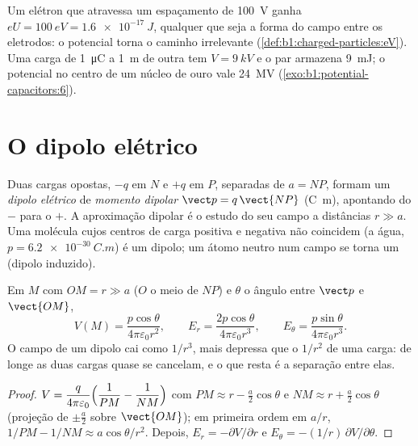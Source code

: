 \begin{example}\label{ex:b1:potential-capacitors:eV}
Um elétron que atravessa um espaçamento de \qty{100}{V} ganha $eU = \qty{100}{eV} =
\qty{1.6e-17}{J}$, qualquer que seja a forma do campo entre os
eletrodos: o potencial torna o caminho irrelevante
(\cref{def:b1:charged-particles:eV}). Uma carga de \qty{1}{\micro C} a
\qty{1}{m} de outra tem $V = \qty{9}{kV}$ e o par armazena
\qty{9}{mJ}; o potencial no centro de um núcleo de ouro vale
\qty{24}{MV} (\cref{exo:b1:potential-capacitors:6}).
\end{example}

\section{O dipolo elétrico}

\begin{definition}\label{def:b1:potential-capacitors:dipole}
Duas cargas opostas, $-q$ em $N$ e $+q$ em $P$, separadas de $a = NP$,
formam um \emph{dipolo elétrico} de \emph{momento dipolar}
$\vect p = q\,\vect{NP}$ (\unit{C.m}), apontando do $-$ para o $+$. A aproximação
dipolar é o estudo do seu campo a distâncias $r \gg a$. Uma
molécula cujos centros de carga positiva e negativa não coincidem
(a água, $p = \qty{6.2e-30}{C.m}$) é um dipolo; um átomo neutro num campo
se torna um (dipolo induzido).
\end{definition}

\begin{proposition}\label{prop:b1:potential-capacitors:dipolefield}
Em $M$ com $OM = r \gg a$ ($O$ o meio de $NP$) e $\theta$ o
ângulo entre $\vect p$ e $\vect{OM}$,
\[
V(M) = \frac{p\cos\theta}{4\pi\varepsilon_0 r^2}, \qquad
E_r = \frac{2p\cos\theta}{4\pi\varepsilon_0r^3}, \qquad
E_\theta = \frac{p\sin\theta}{4\pi\varepsilon_0r^3} .
\]
O campo de um dipolo cai como $1/r^3$, mais depressa que o $1/r^2$ de uma
carga: de longe as duas cargas quase se cancelam, e o que resta é a
separação entre elas.
\end{proposition}

\begin{proof}
$V = \dfrac{q}{4\pi\varepsilon_0}\Bigl(\dfrac1{PM} - \dfrac1{NM}\Bigr)$ com
$PM \approx r - \tfrac a2\cos\theta$ e $NM \approx r + \tfrac a2\cos\theta$
(projeção de $\pm\tfrac a2$ sobre $\vect{OM}$); em primeira ordem em $a/r$,
$1/PM - 1/NM \approx a\cos\theta/r^2$. Depois, $E_r = -\partial V/\partial r$ e
$E_\theta = -(1/r)\,\partial V/\partial\theta$.
\end{proof}

